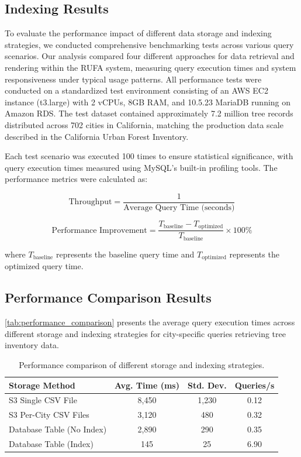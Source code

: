 \subsection{Indexing Results} \label{sec:IndexingResults}

To evaluate the performance impact of different data storage and indexing strategies, we conducted comprehensive benchmarking tests across various query scenarios. Our analysis compared four different approaches for data retrieval and rendering within the RUFA system, measuring query execution times and system responsiveness under typical usage patterns. All performance tests were conducted on a standardized test environment consisting of an AWS EC2 instance (t3.large) with 2 vCPUs, 8GB RAM, and 10.5.23 MariaDB running on Amazon RDS. The test dataset contained approximately 7.2 million tree records distributed across 702 cities in California, matching the production data scale described in the California Urban Forest Inventory.

Each test scenario was executed 100 times to ensure statistical significance, with query execution times measured using MySQL's built-in profiling tools. The performance metrics were calculated as:

\begin{equation}
\text{Throughput} = \frac{1}{\text{Average Query Time (seconds)}}
\end{equation}

\begin{equation}
\text{Performance Improvement} = \frac{T_{\text{baseline}} - T_{\text{optimized}}}{T_{\text{baseline}}} \times 100\%
\end{equation}

where $T_{\text{baseline}}$ represents the baseline query time and $T_{\text{optimized}}$ represents the optimized query time.

\subsection{Performance Comparison Results}

\autoref{tab:performance_comparison} presents the average query execution times across different storage and indexing strategies for city-specific queries retrieving tree inventory data.

\begin{table}[htbp]
\centering
\caption{Performance comparison of different storage and indexing strategies.}
\label{tab:performance_comparison}
\begin{tabular}{p{4cm}ccc}
\hline
\textbf{Storage Method} & \textbf{Avg. Time (ms)} & \textbf{Std. Dev.} & \textbf{Queries/s} \\
\hline
S3 Single CSV File & 8,450 & 1,230 & 0.12 \\
S3 Per-City CSV Files & 3,120 & 480 & 0.32 \\
Database Table (No Index) & 2,890 & 290 & 0.35 \\
Database Table (Index) & 145 & 25 & 6.90 \\
\hline
\end{tabular}
\end{table}

